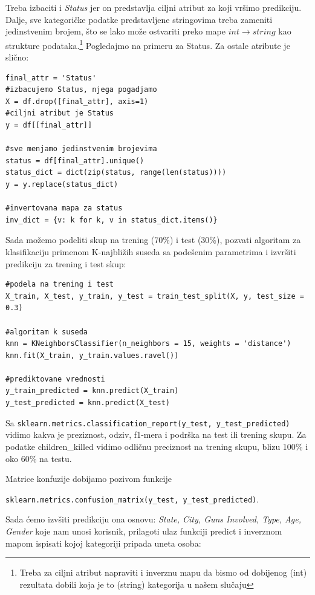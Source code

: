 \documentclass[12pt, a4paper]{article}
\begin{document}
Treba izbaciti i \textit{Status} jer on predstavlja ciljni atribut za koji vr\v simo predikciju. Dalje, sve kategori\v cke podatke predstavljene stringovima treba zameniti jedinstvenim brojem, \v sto se lako mo\v ze ostvariti preko mape  $int \to string$ kao strukture podataka.\footnote{Treba za ciljni atribut napraviti i inverznu mapu da bismo od dobijenog (int) rezultata dobili koja je to (string) kategorija u na\v sem slu\v caju} Pogledajmo na primeru za Status. Za ostale atribute je sli\v cno:

\begin{lstlisting}
final_attr = 'Status'
#izbacujemo Status, njega pogadjamo
X = df.drop([final_attr], axis=1)
#ciljni atribut je Status
y = df[[final_attr]]

#sve menjamo jedinstvenim brojevima
status = df[final_attr].unique()
status_dict = dict(zip(status, range(len(status))))
y = y.replace(status_dict)

#invertovana mapa za status
inv_dict = {v: k for k, v in status_dict.items()}
\end{lstlisting}

\newpage
Sada mo\v zemo podeliti skup na trening (70\%) i test (30\%), pozvati algoritam za klasifikaciju primenom K-najbli\v zih suseda sa pode\v senim parametrima i izvr\v siti predikciju za trening i test skup: 

\begin{lstlisting}
#podela na trening i test
X_train, X_test, y_train, y_test = train_test_split(X, y, test_size = 0.3)

#algoritam k suseda
knn = KNeighborsClassifier(n_neighbors = 15, weights = 'distance')
knn.fit(X_train, y_train.values.ravel())

#prediktovane vrednosti
y_train_predicted = knn.predict(X_train)
y_test_predicted = knn.predict(X_test)
\end{lstlisting}

Sa \verb|sklearn.metrics.classification_report(y_test, y_test_predicted)| vidimo kakva je preziznost, odziv, f1-mera i podr\v ska na test ili trening skupu. Za podatke children\_killed vidimo odli\v cnu preciznost na trening skupu, blizu 100\% i oko 60\% na testu. 

Matrice konfuzije dobijamo pozivom funkcije

\verb|sklearn.metrics.confusion_matrix(y_test, y_test_predicted)|.\break

Sada \' cemo izv\v siti predikciju ona osnovu: \textit{State, City, Guns Involved, Type, Age, Gender} koje nam unosi korisnik, prilagoti ulaz funkciji predict i inverznom mapom ispisati kojoj kategoriji pripada uneta osoba:
\end{document}
